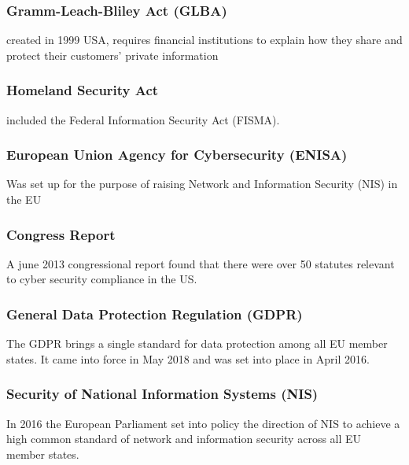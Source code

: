 \documentclass[a4paper]{article}
\theoremstyle{plain}
\theoremstyle{definition}
\theoremstyle{remark}
\begin{document}
\subsubsection{Gramm-Leach-Bliley Act (GLBA)}
created in 1999 USA, requires financial institutions to explain how they share and protect their customers' private information
\subsubsection{Homeland Security Act}
included the Federal Information Security Act (FISMA).
\subsubsection{European Union Agency for Cybersecurity (ENISA)}
Was set up for the purpose of raising Network and Information Security (NIS) in the EU
\subsubsection{Congress Report}
A june 2013 congressional report found that there were over 50 statutes relevant to cyber security compliance in the US.
\subsubsection{General Data Protection Regulation (GDPR)}
The GDPR brings a single standard for data protection among all EU member states. It came into force in May 2018 and was set into place in April 2016.
\subsubsection{Security of National Information Systems (NIS)}
In 2016 the European Parliament set into policy the direction of NIS to achieve a high common standard of network and information security across all EU member states.
\end{document}
